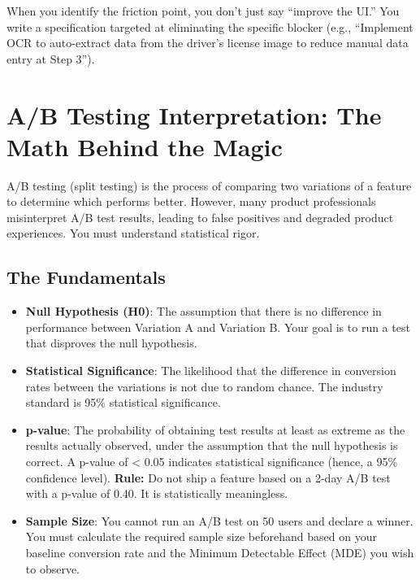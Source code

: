 When you identify the friction point, you don't just say ``improve the
UI.'' You write a specification targeted at eliminating the specific
blocker (e.g., ``Implement OCR to auto-extract data from the driver's
license image to reduce manual data entry at Step 3'').

\bigskip

\section{A/B Testing Interpretation: The Math Behind the
Magic}\label{ab-testing-interpretation-the-math-behind-the-magic}

A/B testing (split testing) is the process of comparing two variations
of a feature to determine which performs better. However, many product
professionals misinterpret A/B test results, leading to false positives
and degraded product experiences. You must understand statistical rigor.

\subsection{The Fundamentals}\label{the-fundamentals}

\begin{itemize}
\tightlist
\item
  \textbf{Null Hypothesis (H0)}: The assumption that there is no
  difference in performance between Variation A and Variation B. Your
  goal is to run a test that disproves the null hypothesis.
\item
  \textbf{Statistical Significance}: The likelihood that the difference
  in conversion rates between the variations is not due to random
  chance. The industry standard is 95\% statistical significance.
\item
  \textbf{p-value}: The probability of obtaining test results at least
  as extreme as the results actually observed, under the assumption that
  the null hypothesis is correct. A p-value of \textless{} 0.05
  indicates statistical significance (hence, a 95\% confidence level).
  \textbf{Rule:} Do not ship a feature based on a 2-day A/B test with a
  p-value of 0.40. It is statistically meaningless.
\item
  \textbf{Sample Size}: You cannot run an A/B test on 50 users and
  declare a winner. You must calculate the required sample size
  beforehand based on your baseline conversion rate and the Minimum
  Detectable Effect (MDE) you wish to observe.
\end{itemize}


